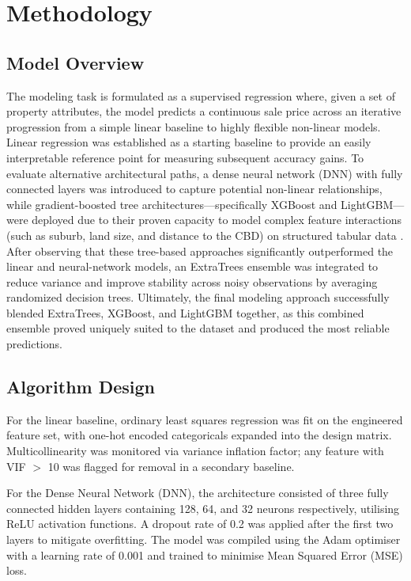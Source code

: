 \documentclass[a4paper,12pt]{article}
\begin{document}
\section{Methodology}

\subsection{Model Overview}
The modeling task is formulated as a supervised regression where, given a set of property attributes, the model predicts a continuous sale price across an iterative progression from a simple linear baseline to highly flexible non-linear models. Linear regression was established as a starting baseline to provide an easily interpretable reference point for measuring subsequent accuracy gains. To evaluate alternative architectural paths, a dense neural network (DNN) with fully connected layers was introduced to capture potential non-linear relationships, while gradient-boosted tree architectures—specifically XGBoost and LightGBM—were deployed due to their proven capacity to model complex feature interactions (such as suburb, land size, and distance to the CBD) on structured tabular data \cite{chen2016xgboost}. After observing that these tree-based approaches significantly outperformed the linear and neural-network models, an ExtraTrees ensemble was integrated to reduce variance and improve stability across noisy observations by averaging randomized decision trees. Ultimately, the final modeling approach successfully blended ExtraTrees, XGBoost, and LightGBM together, as this combined ensemble proved uniquely suited to the dataset and produced the most reliable predictions.

\subsection{Algorithm Design}
For the linear baseline, ordinary least squares regression was fit on the engineered feature set, with one-hot encoded categoricals expanded into the design matrix. Multicollinearity was monitored via variance inflation factor; any feature with VIF $>$ 10 was flagged for removal in a secondary baseline.

For the Dense Neural Network (DNN), the architecture consisted of three fully connected hidden layers containing 128, 64, and 32 neurons respectively, utilising ReLU activation functions. A dropout rate of 0.2 was applied after the first two layers to mitigate overfitting. The model was compiled using the Adam optimiser with a learning rate of 0.001 and trained to minimise Mean Squared Error (MSE) loss.
\end{document}

